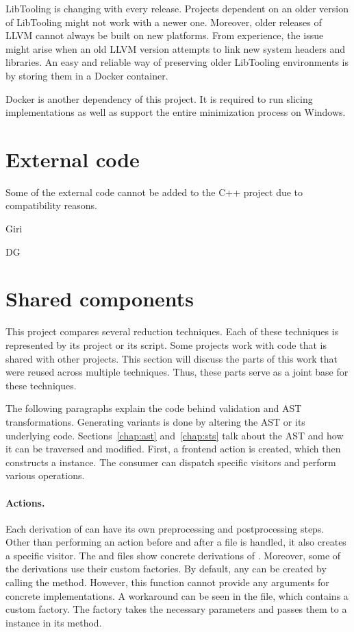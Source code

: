 LibTooling is changing with every release.
Projects dependent on an older version of LibTooling might not work with 
a newer one.
Moreover, older releases of LLVM cannot always be built on new platforms.
From experience, the issue might arise when an old LLVM version attempts 
to link new system headers and libraries.
An easy and reliable way of preserving older LibTooling environments is by 
storing them in a Docker container.

Docker is another dependency of this project.
It is required to run slicing implementations as well as support the entire 
minimization process on Windows.

\section{External code}

Some of the external code cannot be added to the C++ project due to 
compatibility reasons.

Giri

DG

\section{Shared components}

This project compares several reduction techniques.
Each of these techniques is represented by its project or its script.
Some projects work with code that is shared with other projects.
This section will discuss the parts of this work that were reused across 
multiple techniques.
Thus, these parts serve as a joint base for these techniques.

The following paragraphs explain the code behind validation and AST 
transformations.
Generating variants is done by altering the AST or its underlying code.
Sections~\ref{chap:ast} and~\ref{chap:sts} talk about the AST and how it can 
be traversed and modified.
First, a frontend action is created, which then constructs a  
instance.
The consumer can dispatch specific visitors and perform various operations.

\paragraph{Actions.} Each derivation of  can have 
its own preprocessing and postprocessing steps.
Other than performing an action before and after a file is handled, it also 
creates a specific visitor.
The  and  files show concrete derivations 
of .
Moreover, some of the derivations use their custom factories.
By default, any  can be created by calling 
the  method.
However, this function cannot provide any arguments for concrete 
 implementations.
A workaround can be seen in the  file, which contains 
a custom factory.
The factory takes the necessary parameters and passes them to 
a  instance in its  method.

